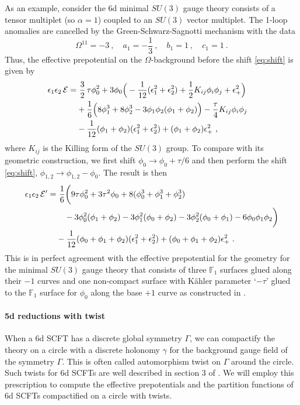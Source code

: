 As an example, consider the 6d minimal $SU(3)$ gauge theory consists of a tensor multiplet (so $\alpha=1$) coupled to an $SU(3)$ vector multiplet. The 1-loop anomalies are cancelled by the Green-Schwarz-Sagnotti mechanism with the data
\begin{equation}\label{eq:GS-SU3}
	\Omega^{11} = -3 \ , \quad a_1 = -\frac{1}{3} \ , \quad b_1 = 1 \ , \quad c_1 = 1 \ .
\end{equation}
Thus, the effective prepotential on the $\Omega$-background before the shift \eqref{eq:shift} is given by
\begin{align}
\epsilon_1\epsilon_2\,\mathcal{E} 
=&~ \frac{3}{2} \,\tau\phi_0^2 +3\phi_0\Big(-\frac{1}{12}(\epsilon_1^2+\epsilon_2^2)+\frac{1}{2}K_{ij}\phi_i\phi_j+\epsilon_+^2\Big)\cr
&+\frac{1}{6}\Big(8\phi_1^3+8\phi_2^3-3\phi_1\phi_2(\phi_1+\phi_2)\Big) -\frac{\tau}{4}K_{ij}\phi_i\phi_j\cr	
&-\frac{1}{12}(\phi_1+\phi_2)(\epsilon_1^2+\epsilon_2^2) + (\phi_1+\phi_2)\epsilon_+^2 \ ,
\end{align}
where $K_{ij}$ is the Killing form of the $SU(3)$ group. To compare with its geometric construction, we first shift $\phi_0\rightarrow \phi_0+\tau/6$ and then perform the shift \eqref{eq:shift}, $\phi_{1,2}\rightarrow \phi_{1,2}-\phi_0$. The result is then
\begin{align}
	\epsilon_1\epsilon_2 \,\mathcal{E}' =& ~\frac{1}{6}\bigg(9\tau\phi_0^2+3\tau^2\phi_0 + 8(\phi_0^3+\phi_1^3+\phi_2^3)\cr
	&\quad -3\phi_0^2(\phi_1+\phi_2)-3\phi_1^2(\phi_0+\phi_2)-3\phi_2^2(\phi_0+\phi_1)-6\phi_0\phi_1\phi_2\bigg) \nonumber \\
	& -\frac{1}{12}(\phi_0+\phi_1+\phi_2)(\epsilon_1^2+\epsilon_2^2) + (\phi_0+\phi_1+\phi_2)\epsilon_+^2 \ .
\end{align}
This is in perfect agreement with the effective prepotential for the geometry for the minimal $SU(3)$ gauge theory that consists of three $\mathbb{F}_1$ surfaces glued along their $-1$ curves and one non-compact surface with K\"ahler parameter `$-\tau$' glued to the $\mathbb{F}_1$ surface for $\phi_0$ along the base $+1$ curve as constructed in \cite{DelZotto:2017pti}.

\paragraph{5d reductions with twist}
When a 6d SCFT has a discrete global symmetry $\Gamma$, we can compactify the theory on a circle with a discrete holonomy $\gamma$ for the background gauge field of the symmetry $\Gamma$. This is often called automorphism twist on $\Gamma$ around the circle. Such twists for 6d SCFTs are well described in section 3 of \cite{Bhardwaj:2019fzv}. We will employ this prescription to compute the effective prepotentials and the partition functions of 6d SCFTs compactified on a circle with twists.

